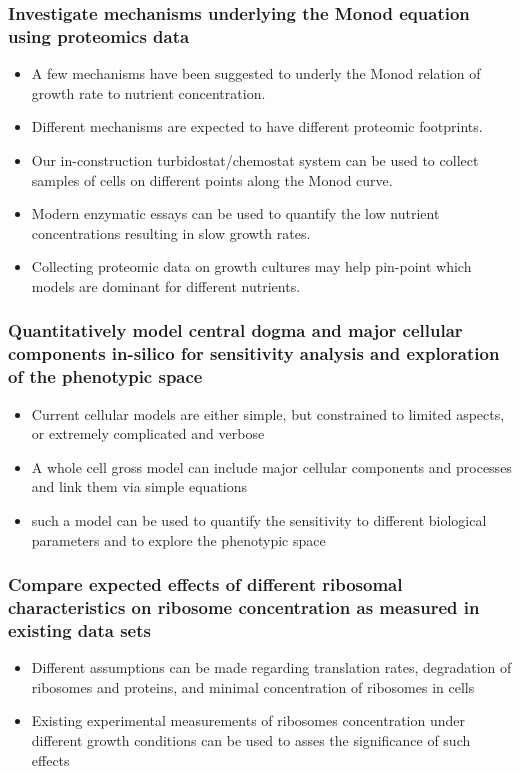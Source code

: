 \documentclass{beamer}
\begin{document}
\begin{frame}
\frametitle{Investigate mechanisms underlying the Monod equation using proteomics data}
\begin{itemize}
\item A few mechanisms have been suggested to underly the Monod relation of growth rate to nutrient concentration.
\item Different mechanisms are expected to have different proteomic footprints.
\item Our in-construction turbidostat/chemostat system can be used to collect samples of cells on different points along the Monod curve.
\item Modern enzymatic essays can be used to quantify the low nutrient concentrations resulting in slow growth rates.
\item Collecting proteomic data on growth cultures may help pin-point which models are dominant for different nutrients.
\end{itemize}
\end{frame}
\begin{frame}
\frametitle{Quantitatively model central dogma and major cellular components in-silico for sensitivity analysis and exploration of the phenotypic space}
\begin{itemize}
\item Current cellular models are either simple, but constrained to limited aspects, or extremely complicated and verbose
\item A whole cell gross model can include major cellular components and processes and link them via simple equations
\item such a model can be used to quantify the sensitivity to different biological parameters and to explore the phenotypic space
\end{itemize}
\end{frame}
\begin{frame}
\frametitle{Compare expected effects of different ribosomal characteristics on ribosome concentration as measured in existing data sets}
\begin{itemize}
\item Different assumptions can be made regarding translation rates, degradation of ribosomes and proteins, and minimal concentration of ribosomes in cells
\item Existing experimental measurements of ribosomes concentration under different growth conditions can be used to asses the significance of such effects
\end{itemize}
\end{frame}
\end{document}
